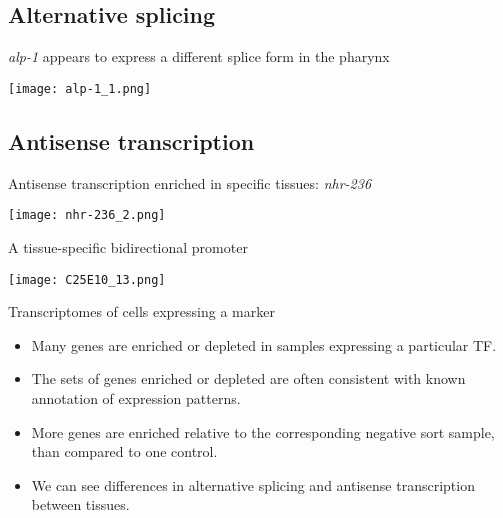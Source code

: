 \documentclass[serif,9pt]{beamer}
\begin{document}
\subsection{Alternative splicing}

\begin{frame}{{\em alp-1} appears to express a different splice form in the pharynx}
\begin{center}
\texttt{[image: alp-1\_1.png]}
\end{center} 
\end{frame}

\subsection{Antisense transcription}

\begin{frame}{Antisense transcription enriched in specific tissues: {\em nhr-236}}

\texttt{[image: nhr-236\_2.png]}

\end{frame}

\begin{frame}{A tissue-specific bidirectional promoter}

\texttt{[image: C25E10\_13.png]}

\end{frame}

\begin{frame}{Transcriptomes of cells expressing a marker}

\begin{itemize}

\item Many genes are enriched or depleted in samples expressing a
particular TF.

\item The sets of genes enriched or depleted are often consistent with
known annotation of expression patterns.

\item More genes are enriched relative to the corresponding negative
sort sample, than compared to one control.

\item We can see differences in alternative splicing and antisense
transcription between tissues.

\end{itemize}

\end{frame}
\end{document}
